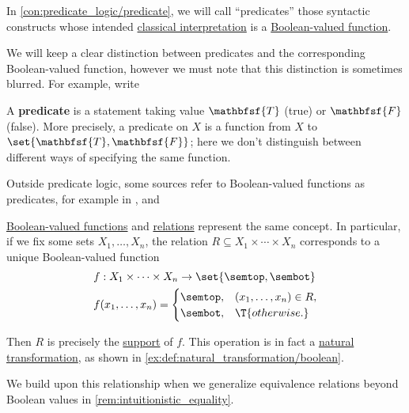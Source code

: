 \begin{remark}\label{rem:boolean_valued_functions_and_predicates}
  In \cref{con:predicate_logic/predicate}, we will call \enquote{predicates} those syntactic constructs whose intended \hyperref[def:truth_value_algebra/classical]{classical interpretation} is a \hyperref[def:boolean_function]{Boolean-valued function}.

  We will keep a clear distinction between predicates and the corresponding Boolean-valued function, however we must note that this distinction is sometimes blurred. For example, \textcite[4]{DaveyPriestley2002LatticeTheory} write
  \begin{displayquote}
    A \textbf{predicate} is a statement taking value \( \mathbfsf{T} \) (true) or \( \mathbfsf{F} \) (false). More precisely, a predicate on \( X \) is a function from \( X \) to \( \set{ \mathbfsf{T}, \mathbfsf{F} } \); here we don't distinguish between different ways of specifying the same function.
  \end{displayquote}

  Outside predicate logic, some sources refer to Boolean-valued functions as predicates, for example in \cite[42]{Rosen2019DiscreteMathematics}, \cite[9]{Яблонский2003ДискретнаяМатематика} and \cite[46]{Мальцев1970АлгебраическиеСистемы}
\end{remark}

\begin{remark}\label{rem:boolean_valued_functions_and_relations}
  \hyperref[def:boolean_function]{Boolean-valued functions} and \hyperref[def:relation]{relations} represent the same concept. In particular, if we fix some sets \( X_1, \ldots, X_n \), the relation \( R \subseteq X_1 \times \cdots \times X_n \) corresponds to a unique Boolean-valued function
  \begin{equation*}
    \begin{aligned}
      &f: X_1 \times \cdots \times X_n \to \set{ \semtop, \sembot } \\
      &f(x_1, \ldots, x_n) = \begin{cases}
        \semtop, &(x_1, \ldots, x_n) \in R, \\
        \sembot, &\T{otherwise.}
      \end{cases}
    \end{aligned}
  \end{equation*}

  Then \( R \) is precisely the \hyperref[def:function_support]{support} of \( f \). This operation is in fact a \hyperref[def:natural_transformation]{natural transformation}, as shown in \cref{ex:def:natural_transformation/boolean}.

  We build upon this relationship when we generalize equivalence relations beyond Boolean values in \cref{rem:intuitionistic_equality}.
\end{remark}

